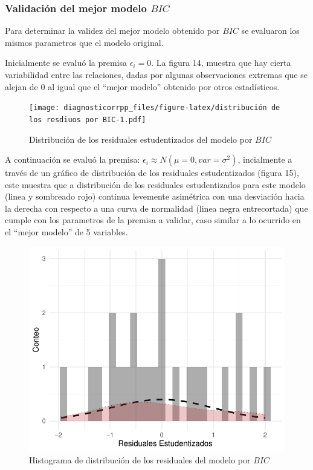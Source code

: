 \documentclass[
]{article}
\begin{document}
\hypertarget{validaciuxf3n-del-mejor-modelo-bic}{%
\subsubsection{\texorpdfstring{Validación del mejor modelo
\(BIC\)}{Validación del mejor modelo BIC}}\label{validaciuxf3n-del-mejor-modelo-bic}}

Para determinar la validez del mejor modelo obtenido por \(BIC\) se
evaluaron los mismos parametros que el modelo original.

Inicialmente se evaluó la premisa \(\epsilon_i = 0\). La figura 14,
muestra que hay cierta variabilidad entre las relaciones, dadas por
algunas observaciones extremas que se alejan de 0 al igual que el
``mejor modelo'' obtenido por otros estadísticos.

\begin{figure}
\centering
\texttt{[image: diagnosticorrpp\_files/figure-latex/distribución de los resdiuos por BIC-1.pdf]}
\caption{Distribución de los residuales estudentizados del modelo por
\(BIC\)}
\end{figure}

A continuación se evaluó la premisa:
\(\epsilon_i \approx N(\mu =0, var=\sigma^2)\), incialmente a través de
un gráfico de distribución de los residuales estudentizados (figura 15),
este muestra que a distribución de los residuales estudentizados para
este modelo (linea y sombreado rojo) continua levemente asimétrica con
una desviación hacia la derecha con respecto a una curva de normalidad
(linea negra entrecortada) que cumple con los parametros de la premisa a
validar, caso similar a lo ocurrido en el ``mejor modelo'' de 5
variables.

\begin{figure}
\centering
\includegraphics{diagnosticorrpp_files/figure-latex/gráfica para distribución de residuales por BIC-1.pdf}
\caption{Histograma de distribución de los residuales del modelo por
\(BIC\)}
\end{figure}
\end{document}
